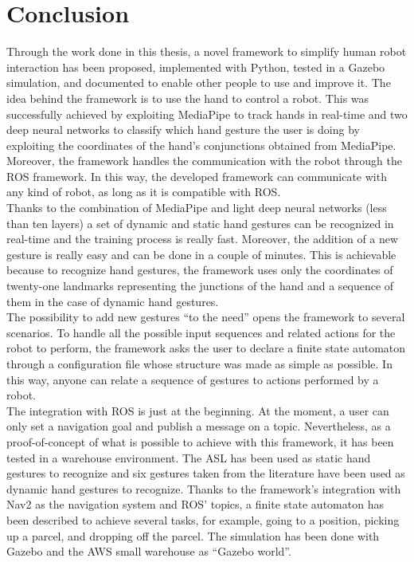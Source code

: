 \documentclass[../thesis.tex]{subfiles}
\begin{document}
\chapter{Conclusion}\label{cap:conclusion}
Through the work done in this thesis, a novel framework to simplify human robot interaction has been proposed, implemented with Python, tested in a Gazebo simulation, and documented to enable other people to use and improve it. The idea behind the framework is to use the hand to control a robot. This was successfully achieved by exploiting MediaPipe to track hands in real-time and two deep neural networks to classify which hand gesture the user is doing by exploiting the coordinates of the hand's conjunctions obtained from MediaPipe. Moreover, the framework handles the communication with the robot through the \gls{ROS} framework. In this way, the developed framework can communicate with any kind of robot, as long as it is compatible with \gls{ROS}.\\

Thanks to the combination of MediaPipe and light deep neural networks (less than ten layers) a set of dynamic and static hand gestures can be recognized in real-time and the training process is really fast. Moreover, the addition of a new gesture is really easy and can be done in a couple of minutes. This is achievable because to recognize hand gestures, the framework uses only the coordinates of twenty-one landmarks representing the junctions of the hand and a sequence of them in the case of dynamic hand gestures.\\

The possibility to add new gestures ``to the need'' opens the framework to several scenarios. To handle all the possible input sequences and related actions for the robot to perform, the framework asks the user to declare a finite state automaton through a configuration file whose structure was made as simple as possible. In this way, anyone can relate a sequence of gestures to actions performed by a robot.\\

The integration with \gls{ROS} is just at the beginning. At the moment, a user can only set a navigation goal and publish a message on a topic. Nevertheless, as a proof-of-concept of what is possible to achieve with this framework, it has been tested in a warehouse environment. The \gls{ASL} has been used as static hand gestures to recognize and six gestures taken from the literature have been used as dynamic hand gestures to recognize. Thanks to the framework's integration with Nav2 as the navigation system and \gls{ROS}' topics, a finite state automaton has been described to achieve several tasks, for example, going to a position, picking up a parcel, and dropping off the parcel. The simulation has been done with Gazebo and the AWS small warehouse as ``Gazebo world''.\\
\end{document}
